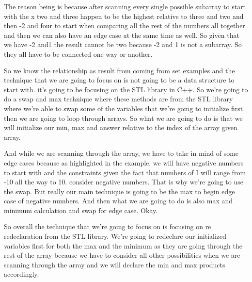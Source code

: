 \expandafter\def\csname sourceexcerpt@27\endcsname{%
The reason being is because after scanning every single possible subarray to start
with the x two and three happen to be the highest relative to three and two and then
-2 and four to start when comparing all the rest of the numbers all together and then
we can also have an edge case at the same time as well. So given that we have -2 and1
the result cannot be two because -2 and 1 is not a subarray. So they all have to be
connected one way or another.

So we know the relationship as result from coming from set examples and the technique
that we are going to focus on is not going to be a data structure to start with. it's
going to be focusing on the STL library in C++. So we're going to do a swap and max
technique where these methods are from the STL library where we're able to swap some
of the variables that we're going to initialize first then we are going to loop
through arrays. So what we are going to do is that we will initialize our min, max and
answer relative to the index of the array given array.

And while we are scanning through the array, we have to take in mind of some edge
cases because as highlighted in the example, we will have negative numbers to start
with and the constraints given the fact that numbers of I will range from -10 all the
way to 10. consider negative numbers. That is why we're going to use the swap. But
really our main technique is going to be the max to begin edge case of negative
numbers. And then what we are going to do is also max and minimum calculation and swap for
edge case. Okay.

So overall the technique that we're going to focus on is focusing on re redeclaration
from the STL library. We're going to redeclare our initialized variables first for
both the max and the minimum as they are going through the rest of the array because we
have to consider all other possibilities when we are scanning through the array and we
will declare the min and max products accordingly.
}

